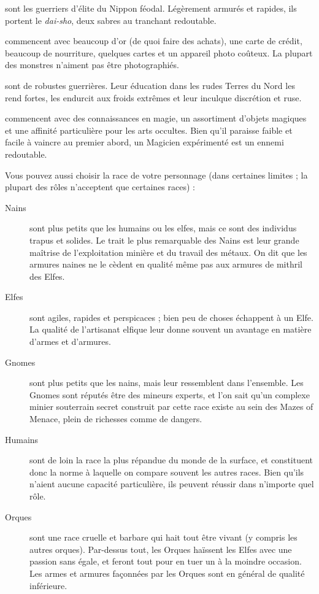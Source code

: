 \documentclass[titlepage]{article}
\begin{document}
\begin{description}
sont les guerriers d'élite du Nippon féodal.  Légèrement
armurés et rapides, ils portent le %
\textit{dai-sho}, deux sabres au tranchant
redoutable.
%
\item[Touristes]
commencent avec beaucoup d'or (de quoi faire des achats),
une carte de crédit, beaucoup de nourriture, quelques cartes et un appareil
photo coûteux.  La plupart des monstres n'aiment pas être photographiés.
%
\item[Valkyries]
sont de robustes guerrières.  Leur éducation dans les rudes
Terres du Nord les rend fortes, les endurcit aux froids extrêmes et leur
inculque discrétion et ruse.
%
\item[Magiciens]
commencent avec des connaissances en magie, un assortiment
d'objets magiques et une affinité particulière pour les arts occultes.  Bien
qu'il paraisse faible et facile à vaincre au premier abord, un Magicien
expérimenté est un ennemi redoutable.
\end{description}

Vous pouvez aussi choisir la race de votre personnage (dans certaines limites ;
la plupart des rôles n'acceptent que certaines races) :

%
\begin{description}
\item[Nains]
sont plus petits que les humains ou les elfes, mais ce sont des
individus trapus et solides.  Le trait le plus remarquable des Nains est leur
grande maîtrise de l'exploitation minière et du travail des métaux.  On dit
que les armures naines ne le cèdent en qualité même pas aux armures de mithril
des Elfes.
%
\item[Elfes]
sont agiles, rapides et perspicaces ; bien peu de choses
échappent à un Elfe.  La qualité de l'artisanat elfique leur donne souvent
un avantage en matière d'armes et d'armures.
%
\item[Gnomes]
sont plus petits que les nains, mais leur ressemblent dans
l'ensemble.  Les Gnomes sont réputés être des mineurs experts, et l'on sait
qu'un complexe minier souterrain secret construit par cette race existe au
sein des Mazes of Menace, plein de richesses comme de dangers.
%
\item[Humains]
sont de loin la race la plus répandue du monde de la surface,
et constituent donc la norme à laquelle on compare souvent les autres races.
Bien qu'ils n'aient aucune capacité particulière, ils peuvent réussir dans
n'importe quel rôle.
%
\item[Orques]
sont une race cruelle et barbare qui hait tout être vivant
(y compris les autres orques).  Par-dessus tout, les Orques haïssent les Elfes
avec une passion sans égale, et feront tout pour en tuer un à la moindre occasion.
Les armes et armures façonnées par les Orques sont en général de qualité inférieure.
\end{description}
\end{document}
